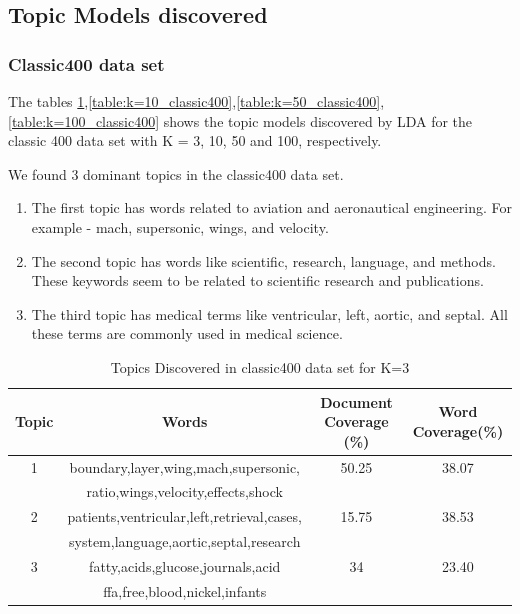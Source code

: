 \documentclass[11pt,a4paper,oneside]{article}
\begin{document}
\subsection{Topic Models discovered}
\subsubsection{Classic400 data set}
The tables \ref{table:k=3_classic400},\ref{table:k=10_classic400},\ref{table:k=50_classic400},\ref{table:k=100_classic400} shows the topic models discovered by LDA for the classic 400 data set with K = 3, 10, 50 and 100, respectively. 

We found 3 dominant topics in the classic400 data set. 
\begin{enumerate}
\item The first topic has words related to aviation and aeronautical engineering. For example - mach, supersonic, wings, and velocity.
\item The second topic has words like scientific, research, language, and methods. These keywords seem to be related to scientific research and publications.
\item The third topic has medical terms like ventricular, left, aortic, and septal. All these terms are commonly used in medical science.
\end{enumerate}

\begin{table}
\begin{tabular}{|c|c|c|c|}
\hline 
Topic & Words & Document Coverage (\%) & Word Coverage(\%) \\ 
\hline 
1 & boundary,layer,wing,mach,supersonic, & 50.25 & 38.07 \\ 
  & ratio,wings,velocity,effects,shock & & \\
\hline 
2 & patients,ventricular,left,retrieval,cases, & 15.75 & 38.53 \\ 
  & system,language,aortic,septal,research & & \\
\hline 
3 & fatty,acids,glucose,journals,acid & 34 & 23.40 \\ 
 & ffa,free,blood,nickel,infants & & \\
\hline
\end{tabular}
\caption{Topics Discovered in classic400 data set for K=3}
\label{table:k=3_classic400}
\end{table}
\end{document}
